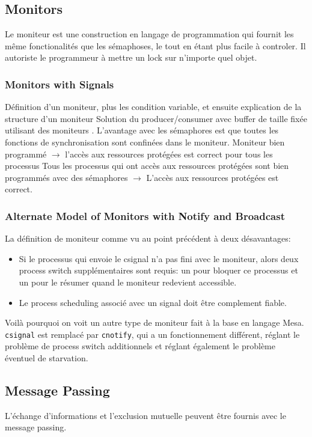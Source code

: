 \subsection{Monitors}
Le moniteur est une construction en langage de programmation qui fournit les même fonctionalités que les sémaphoses, le tout en étant plus facile à controler.
Il autoriste le programmeur à mettre un lock sur n'importe quel objet.

\subsubsection{Monitors with Signals}
Définition d'un moniteur, plus les condition variable, et ensuite explication de la structure d'un moniteur \cite[p.~248]{stallings}
Solution du producer/consumer avec buffer de taille fixée utilisant des moniteurs \cite[p.~249]{stallings}.
L'avantage avec les sémaphores est que toutes les fonctions de synchronisation sont confinées dans le moniteur.
Moniteur bien programmé $\to$ l'accès aux ressources protégées est correct pour tous les processus
Tous les processus qui ont accès aux ressources protégées sont bien programmés avec des sémaphores
$\to$ L'accès aux ressources protégées est correct.

\subsubsection{Alternate Model of Monitors with Notify and Broadcast}
La définition de moniteur comme vu au point précédent à deux désavantages:
\begin{itemize}
  \item Si le processus qui envoie le csignal n'a pas fini avec le moniteur, alors deux process switch supplémentaires sont requis:
    un pour bloquer ce processus et un pour le résumer quand le moniteur redevient accessible.
  \item Le process scheduling associé avec un signal doit être complement fiable.
\end{itemize}

Voilà pourquoi on voit un autre type de moniteur fait à la base en langage Mesa.
\lstinline|csignal| est remplacé par \lstinline|cnotify|, qui a un fonctionnement différent,
réglant le problème de process switch additionnels et réglant également le problème éventuel de starvation.

\subsection{Message Passing}
L'échange d'informations et l'exclusion mutuelle peuvent être fournis avec le message passing.

